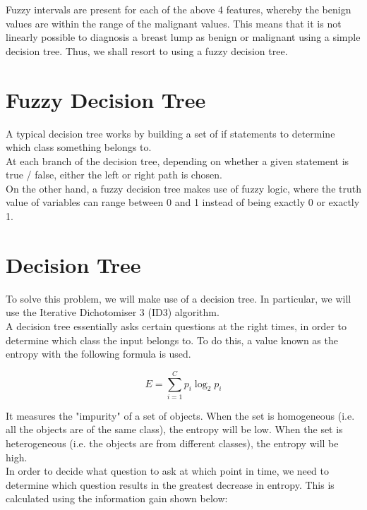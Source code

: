 Fuzzy intervals are present for each of the above 4 features, whereby the benign values are within the range of the malignant values. This means that it is not linearly possible to diagnosis a breast lump as benign or malignant using a simple decision tree. Thus, we shall resort to using a fuzzy decision tree. \\

\section{Fuzzy Decision Tree}
A typical decision tree works by building a set of if statements to determine which class something belongs to. \\

At each branch of the decision tree, depending on whether a given statement is true / false, either the left or right path is chosen. \\

On the other hand, a fuzzy decision tree makes use of fuzzy logic, where the truth value of variables can range between 0 and 1 instead of being exactly 0 or exactly 1. \\
\fi

\section{Decision Tree}
To solve this problem, we will make use of a decision tree. In particular, we will use the Iterative Dichotomiser 3 (ID3) algorithm. \\

 A decision tree essentially asks certain questions at the right times, in order to determine which class the input belongs to. To do this, a value known as the entropy with the following formula is used.

$$E = \sum_{i=1}^{C}p_i\log_2 p_i$$

It measures the "impurity" of a set of objects. When the set is homogeneous (i.e. all the objects are of the same class), the entropy will be low. When the set is heterogeneous (i.e. the objects are from different classes), the entropy will be high. \\

 In order to decide what question to ask at which point in time, we need to determine which question results in the greatest decrease in entropy. This is calculated using the information gain shown below:


